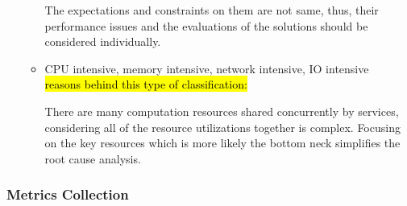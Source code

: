 \begin{itemize}
\begin{itemize}
        The expectations and constraints on them are not same, thus, their performance issues and the evaluations of the solutions should be considered individually.
      \item CPU intensive, memory intensive, network intensive, IO intensive \\
        \hl{reasons behind this type of classification:}

        There are many computation resources shared concurrently by services, considering all of the resource utilizations together is complex. Focusing on the key resources which is more likely the bottom neck simplifies the root cause analysis.
    \end{itemize}
\end{itemize}

\subsubsection{Metrics Collection}

